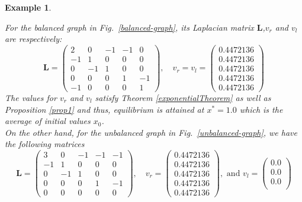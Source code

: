 \documentclass[10pt,a4paper]{article}
\newtheorem{exa}{Example}
\begin{document}
\begin{exa}
\begin{figure}[H]
      		\label{unbalanced-diffusion}		
      	\end{figure} 
   For the balanced graph in Fig.~\ref{balanced-graph}, its Laplacian matrix $\mathbf{L}$,$v_r$ and $v_l$ are respectively:
   \begin{equation*}
   \mathbf{L} = \begin{pmatrix}
    2 &  0 & -1 & -1 &  0 \\
   -1 & 1  & 0  & 0  &  0 \\ 
    0 & -1 & 1  & 0  &  0 \\
    0 &  0 & 0  & 1  & -1 \\
    -1&  0 & 0  & 0  & 1
   \end{pmatrix}, \quad 
   v_r = v_l = \begin{pmatrix}
   0.4472136 \\  
   0.4472136 \\  
   0.4472136 \\ 
   0.4472136 \\
   0.4472136
   \end{pmatrix}
   \end{equation*} 
   The values for $v_r$ and $v_l$ satisfy Theorem \ref{exponentialTheorem} as well as Proposition \ref{prop1} and thus, equilibrium is attained at $x^*=1.0$ which is the average of initial values $x_0$.\\
   On the other hand, for the unbalanced graph in Fig.~\ref{unbalanced-graph}, we have the following matrices
    \begin{equation*}
   \mathbf{L} = \begin{pmatrix}
    3 &  0 & -1 & -1 & -1 \\
   -1 &  1 & 0  & 0  & 0  \\
    0 & -1 & 1  & 0  & 0  \\
    0 &  0 & 0  & 1  & -1 \\
    0 &  0 & 0  & 0  & 0
   \end{pmatrix}, \quad 
   v_r = \begin{pmatrix}
   0.4472136 \\  
   0.4472136 \\  
   0.4472136 \\ 
   0.4472136 \\
   0.4472136
   \end{pmatrix}, \text{ and }
   v_l = \begin{pmatrix}
   0.0 \\  
   0.0 \\  
   0.0 \\ 

\end{pmatrix}
\end{equation*}
\end{exa}
\end{document}
